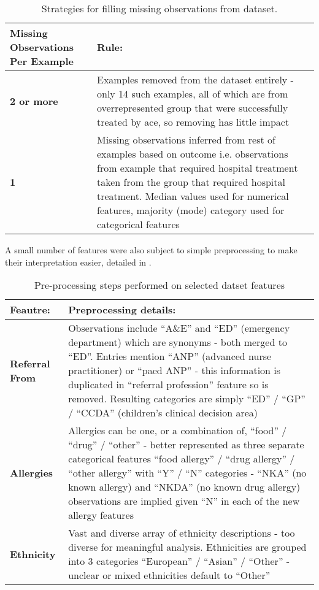 \begin{table}[H]
    \centering
    \renewcommand\arraystretch{1.7}
    \begin{tabular}[h]{ P{30mm} P{110mm} }
        \toprule
        \textbf{Missing Observations Per Example} & \textbf{Rule:} \\
        \toprule
        \textbf{2 or more} & Examples removed from the dataset entirely - only 14 such examples, all of which are from overrepresented group that were successfully treated by ace, so removing has little impact \\
        \textbf{1} & Missing observations inferred from rest of examples based on outcome i.e. observations from example that required hospital treatment taken from the group that required hospital treatment.
        Median values used for numerical features, majority (mode) category used for categorical features \\
        \toprule
    \end{tabular}
    \caption{Strategies for filling missing observations from dataset.}
    \label{tab:missing-values}
\end{table}

A small number of features were also subject to simple preprocessing to make their interpretation easier, detailed in .

\begin{table}[H]
    \centering
    \renewcommand\arraystretch{1.7}
    \begin{tabular}[h]{ P{30mm} P{110mm} }
        \toprule
        \textbf{Feautre:} & \textbf{Preprocessing details:} \\
        \toprule
        \textbf{Referral From} & Observations include ``A\&E'' and ``ED'' (emergency department) which are synonyms - both merged to ``ED''. Entries mention ``ANP'' (advanced nurse practitioner) or ``paed ANP'' - this information is duplicated in ``referral profession'' feature so is removed. Resulting categories are simply ``ED'' / ``GP'' / ``CCDA'' (children's clinical decision area) \\
        \textbf{Allergies} & Allergies can be one, or a combination of, ``food'' / ``drug'' / ``other'' - better represented as three separate categorical features ``food allergy'' / ``drug allergy'' / ``other allergy'' with ``Y'' / ``N'' categories - ``NKA'' (no known allergy) and ``NKDA'' (no known drug allergy) observations are implied given ``N'' in each of the new allergy features \\
        \textbf{Ethnicity} & Vast and diverse array of ethnicity descriptions - too diverse for meaningful analysis. Ethnicities are grouped into 3 categories ``European'' / ``Asian'' / ``Other'' - unclear or mixed ethnicities default to ``Other'' \\
        \toprule
    \end{tabular}
    \caption{Pre-processing steps performed on selected datset features}
    \label{tab:feature-preprocessing}
\end{table}

